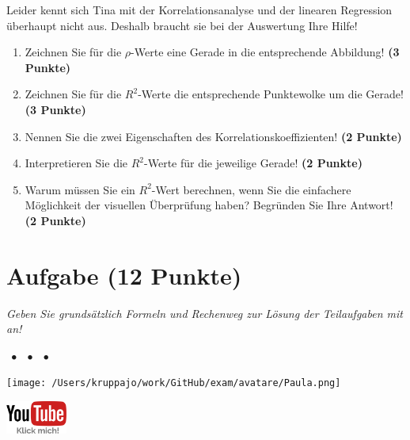 \documentclass[a4paper, 9pt]{scrartcl}\usepackage[]{graphicx}\usepackage[]{xcolor}
\begin{document}
\vspace{2Ex}

Leider kennt sich Tina mit der Korrelationsanalyse und der linearen Regression überhaupt nicht aus. Deshalb braucht sie bei der Auswertung Ihre Hilfe!

\begin{enumerate}
\item Zeichnen Sie für die $\rho$-Werte eine Gerade in die entsprechende Abbildung! \textbf{(3 Punkte)}
\item Zeichnen Sie für die $R^2$-Werte die entsprechende Punktewolke um die Gerade! \textbf{(3 Punkte)}
\item Nennen Sie die zwei Eigenschaften des Korrelationskoeffizienten! \textbf{(2 Punkte)}
\item Interpretieren Sie die $R^2$-Werte für die jeweilige Gerade! \textbf{(2 Punkte)}
\item Warum müssen Sie ein $R^2$-Wert berechnen, wenn Sie die einfachere Möglichkeit der visuellen Überprüfung haben? Begründen Sie Ihre Antwort! \textbf{(2 Punkte)}
\end{enumerate}
 
\clearpage

\section{Aufgabe \hfill (12 Punkte)}

\textit{Geben Sie grundsätzlich Formeln und Rechenweg zur Lösung der Teilaufgaben mit an!} \\[1Ex]
 

 
\ifcollection
\begin{flushright}
\tiny\vspace{-3Ex}
\textbf{\examinhaltstart}
\exammodulestat $\;\bullet$
\exammodulestatbbv $\;\bullet$
\exammodulestatversuch $\;\bullet$
\exammodulebiostat
\vspace{-4Ex}
\end{flushright}
\begin{minipage}[t]{0.5\textwidth}
\texttt{[image: /Users/kruppajo/work/GitHub/exam/avatare/Paula.png]}
\end{minipage}
\begin{minipage}[t]{0.5\textwidth}
\hfill
\href{https://youtu.be/2QJa19ZwLls}{\includegraphics[width = 2cm]{img/youtube}}
\end{minipage}
\vspace{-3ex}
\fi
\end{document}
